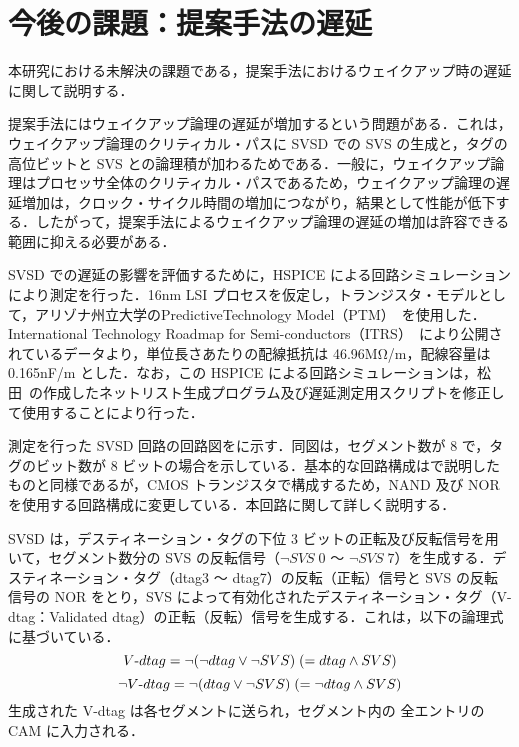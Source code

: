 
\chapter{今後の課題：提案手法の遅延}
\label{sec:appendix3}
本研究における未解決の課題である，提案手法におけるウェイクアップ時の遅延に関して説明する．

提案手法にはウェイクアップ論理の遅延が増加するという問題がある．これは，ウェイクアップ論理のクリティカル・パスに SVSD での SVS の生成と，タグの高位ビットと SVS との論理積が加わるためである．一般に，ウェイクアップ論理はプロセッサ全体のクリティカル・パスであるため，ウェイクアップ論理の遅延増加は，クロック・サイクル時間の増加につながり，結果として性能が低下する．したがって，提案手法によるウェイクアップ論理の遅延の増加は許容できる範囲に抑える必要がある．

SVSD での遅延の影響を評価するために，HSPICE による回路シミュレーションにより測定を行った．16nm LSI プロセスを仮定し，トランジスタ・モデルとして，アリゾナ州立大学のPredictiveTechnology Model（PTM）~\cite{model2012}を使用した．International Technology Roadmap for Semi-conductors（ITRS）~\cite{itrs2012}により公開されているデータより，単位長さあたりの配線抵抗は 46.96M\si{\ohm}/\si{\metre}，配線容量は 0.165nF/m とした．なお，この HSPICE による回路シミュレーションは，松田~\cite{matsuda-thesis}の作成したネットリスト生成プログラム及び遅延測定用スクリプトを修正して使用することにより行った． 

測定を行った SVSD 回路の回路図をに示す．同図は，セグメント数が 8 で，タグのビット数が 8 ビットの場合を示している．基本的な回路構成はで説明したものと同様であるが，CMOS トランジスタで構成するため，NAND 及び NOR を使用する回路構成に変更している．本回路に関して詳しく説明する．

SVSD は，デスティネーション・タグの下位 3 ビットの正転及び反転信号を用いて，セグメント数分の SVS の反転信号（$\lnot SVS\;0$ 〜 $\lnot SVS\;7$）を生成する．デスティネーション・タグ（dtag3 〜 dtag7）の反転（正転）信号と SVS の反転信号の NOR をとり，SVS によって有効化されたデスティネーション・タグ（V-dtag：Validated dtag）の正転（反転）信号を生成する．これは，以下の論理式に基づいている．
\[
  V\mathchar`-dtag = \lnot (\lnot dtag \lor \lnot SVS) \; (= dtag \land SVS) 
\]
\[
  \lnot V\mathchar`-dtag = \lnot (dtag \lor \lnot SVS) \; (= \lnot dtag \land SVS) 
\]
生成された V-dtag は各セグメントに送られ，セグメント内の 全エントリの CAM に入力される．

